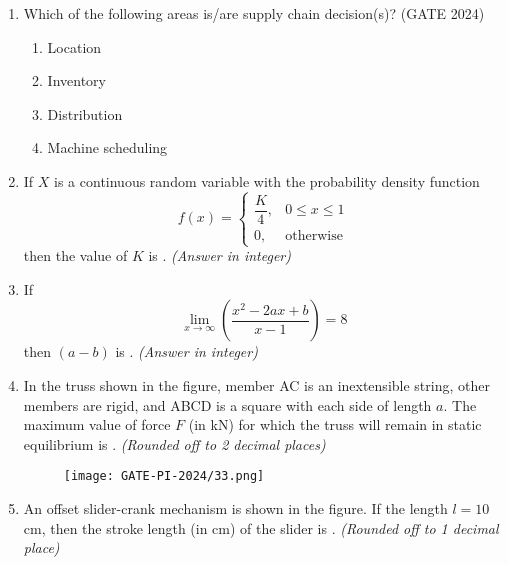 \documentclass[journal,12pt,onecolumn]{IEEEtran}
\theoremstyle{remark}
\begin{document}
\begin{enumerate}
\vspace{1cm}

\item Which of the following areas is/are supply chain decision(s)?
\hfill{(GATE 2024)}
\begin{multicols}{4}
\begin{enumerate}
    \item Location
    \item Inventory
    \item Distribution
    \item Machine scheduling
\end{enumerate}
\end{multicols}
\vspace{1cm}

\item If $X$ is a continuous random variable with the probability density function
\[
f(x) = 
\begin{cases}
\dfrac{K}{4}, & 0 \leq x \leq 1 \\
0, & \text{otherwise}
\end{cases}
\]
then the value of $K$ is \underline{\hspace{2cm}}. \textit{(Answer in integer)}
\vspace{1cm}

\item If
\[
\lim_{x \to \infty} \left(\frac{x^2 - 2ax + b}{x - 1}\right) = 8
\]
then $(a - b)$ is \underline{\hspace{2cm}}. \textit{(Answer in integer)}
\vspace{1cm}
\newpage
\item In the truss shown in the figure, member AC is an inextensible string, other members are rigid, and ABCD is a square with each side of length $a$. The maximum value of force $F$ (in kN) for which the truss will remain in static equilibrium is \underline{\hspace{2cm}}. \textit{(Rounded off to 2 decimal places)}

\begin{figure}[H]
    \centering
    \texttt{[image: GATE-PI-2024/33.png]}
    \caption{}
    \label{33}
\end{figure}
\vspace{1cm}

\item An offset slider-crank mechanism is shown in the figure. If the length $l = 10$ cm, then the stroke length (in cm) of the slider is \underline{\hspace{2cm}}. \textit{(Rounded off to 1 decimal place)}


\end{enumerate}
\end{document}
